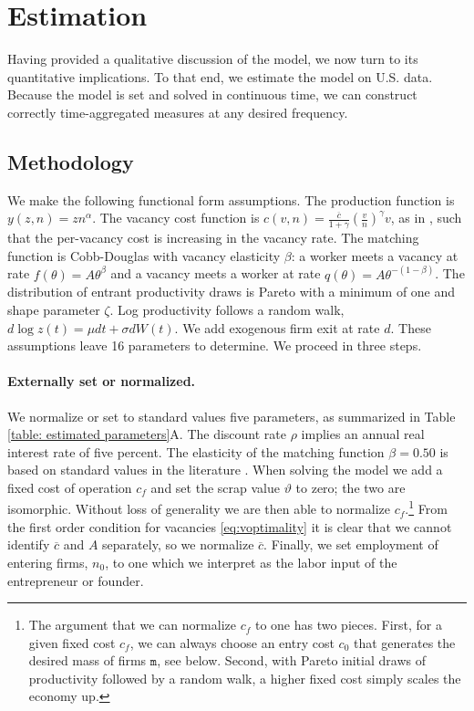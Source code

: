 \section{Estimation}\label{sec:calibration}

Having provided a qualitative discussion of the model, we now turn to its quantitative implications.
To that end, we estimate the model on U.S. data.
Because the model is set and solved in continuous time, we can construct correctly time-aggregated measures at any desired frequency.

\subsection{Methodology}
We make the following functional form assumptions.
The production function is $y(z,n)=zn^\alpha$.
The vacancy cost function is $c(v,n) = \frac{\overline{c}}{1+\gamma}\left(\frac{v}{n}\right)^{\gamma}v$, as in \citet{KassKircher}, such that the per-vacancy cost is increasing in the vacancy rate.
The matching function is Cobb-Douglas with vacancy elasticity $\beta$: a worker meets a vacancy at rate $f(\theta)=A\theta^{\beta}$ and a vacancy meets a worker at rate $q(\theta)=A\theta^{-(1-\beta)}$.
The distribution of entrant productivity draws is Pareto with a minimum of one and shape parameter $\zeta$.
Log productivity follows a random walk, $d \log z(t) = \mu dt + \sigma dW(t)$.
We add exogenous firm exit at rate $d$.
These assumptions leave 16 parameters to determine. We proceed in three steps.

\paragraph{Externally set or normalized.}
We normalize or set to standard values five parameters, as summarized in Table \ref{table: estimated parameters}A.
The discount rate $\rho$ implies an annual real interest rate of five percent.
The elasticity of the matching function $\beta=0.50$ is based on standard values in the literature \citep{Petrongolo2001}.
When solving the model we add a fixed cost of operation $c_f$ and set the scrap value $\vartheta$ to zero; the two are isomorphic.
Without loss of generality we are then able to normalize $c_f$.\footnote{
    The argument that we can normalize $c_f$ to one has two pieces.
    First, for a given fixed cost $c_f$, we can always choose an entry cost $c_0$ that generates the desired mass of firms $\mathtt{m}$, see below.
    Second, with Pareto initial draws of productivity followed by a random walk, a higher fixed cost simply scales the economy up.}
From the first order condition for vacancies \eqref{eq:voptimality} it is clear that we cannot identify $\overline{c}$ and $A$ separately, so we normalize $\overline{c}$.
Finally, we set employment of entering firms, $n_0$, to one which we interpret as the labor input of the entrepreneur or founder.

